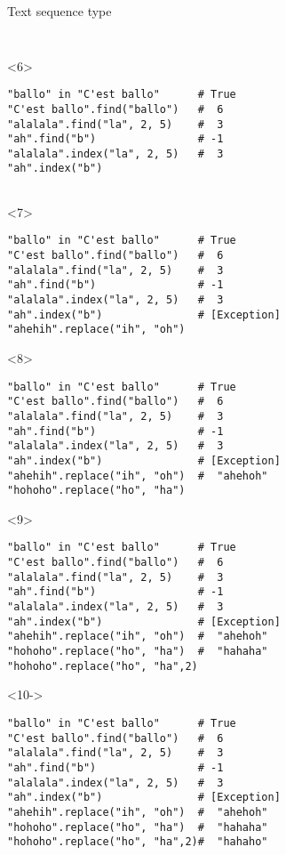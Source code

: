 \begin{frame}[fragile]{Text sequence type}
\begin{columns}[onlytextwidth]
\begin{column}{\textwidth}
\begin{onlyenv}
\begin{lstlisting}[style=python]
 \end{lstlisting}
      \end{onlyenv}

      \begin{onlyenv}<6>
        \begin{lstlisting}[style=python]
"ballo" in "C'est ballo"      # True
"C'est ballo".find("ballo")   #  6
"alalala".find("la", 2, 5)    #  3
"ah".find("b")                # -1
"alalala".index("la", 2, 5)   #  3
"ah".index("b")


 \end{lstlisting}
      \end{onlyenv}

      \begin{onlyenv}<7>
        \begin{lstlisting}[style=python]
"ballo" in "C'est ballo"      # True
"C'est ballo".find("ballo")   #  6
"alalala".find("la", 2, 5)    #  3
"ah".find("b")                # -1
"alalala".index("la", 2, 5)   #  3
"ah".index("b")               # [Exception]
"ahehih".replace("ih", "oh")

 \end{lstlisting}
      \end{onlyenv}

      \begin{onlyenv}<8>
        \begin{lstlisting}[style=python]
"ballo" in "C'est ballo"      # True
"C'est ballo".find("ballo")   #  6
"alalala".find("la", 2, 5)    #  3
"ah".find("b")                # -1
"alalala".index("la", 2, 5)   #  3
"ah".index("b")               # [Exception]
"ahehih".replace("ih", "oh")  #  "ahehoh"
"hohoho".replace("ho", "ha")
 \end{lstlisting}
      \end{onlyenv}

      \begin{onlyenv}<9>
        \begin{lstlisting}[style=python]
"ballo" in "C'est ballo"      # True
"C'est ballo".find("ballo")   #  6
"alalala".find("la", 2, 5)    #  3
"ah".find("b")                # -1
"alalala".index("la", 2, 5)   #  3
"ah".index("b")               # [Exception]
"ahehih".replace("ih", "oh")  #  "ahehoh"
"hohoho".replace("ho", "ha")  #  "hahaha"
"hohoho".replace("ho", "ha",2) \end{lstlisting}
      \end{onlyenv}

      \begin{onlyenv}<10->
        \begin{lstlisting}[style=python]
"ballo" in "C'est ballo"      # True
"C'est ballo".find("ballo")   #  6
"alalala".find("la", 2, 5)    #  3
"ah".find("b")                # -1
"alalala".index("la", 2, 5)   #  3
"ah".index("b")               # [Exception]
"ahehih".replace("ih", "oh")  #  "ahehoh"
"hohoho".replace("ho", "ha")  #  "hahaha"
"hohoho".replace("ho", "ha",2)#  "hahaho" \end{lstlisting}
      \end{onlyenv}


\end{column}
\end{columns}
\end{frame}
